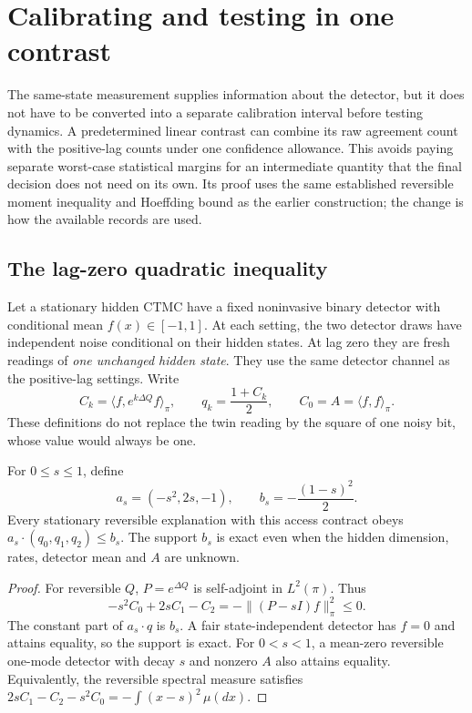 \chapter{Calibrating and testing in one contrast}
\label{ch:ci-joint-calibration}

The same-state measurement supplies information about the detector, but it
does not have to be converted into a separate calibration interval before
testing dynamics. A predetermined linear contrast can combine its raw
agreement count with the positive-lag counts under one confidence allowance.
This avoids paying separate worst-case statistical margins for an intermediate
quantity that the final decision does not need on its own. Its proof uses the
same established reversible moment inequality and Hoeffding bound as the
earlier construction; the change is how the available records are used.

\section{The lag-zero quadratic inequality}
Let a stationary hidden CTMC have a fixed noninvasive binary detector with
conditional mean $f(x)\in[-1,1]$. At each setting, the two detector draws have
independent noise conditional on their hidden states. At lag zero they are
fresh readings of \emph{one unchanged hidden state}. They use the same detector
channel as the positive-lag settings. Write
\[
 C_k=\langle f,e^{k\Delta Q}f\rangle_\pi,\qquad
 q_k=\frac{1+C_k}{2},\qquad C_0=A=\langle f,f\rangle_\pi.
\]
These definitions do not replace the twin reading by the square of one noisy
bit, whose value would always be one.

\begin{proposition}
For $0\leq s\leq1$, define
\begin{equation}
 a_s=(-s^2,2s,-1),\qquad b_s=-\frac{(1-s)^2}{2}.
 \label{eq:ci-joint-support}
\end{equation}
Every stationary reversible explanation with this access contract obeys
$a_s\cdot(q_0,q_1,q_2)\leq b_s$. The support $b_s$ is exact even when the
hidden dimension, rates, detector mean and $A$ are unknown.
\end{proposition}
\begin{proof}
For reversible $Q$, $P=e^{\Delta Q}$ is self-adjoint in $L^2(\pi)$. Thus
\[
 -s^2 C_0+2s C_1-C_2=-\|(P-sI)f\|_\pi^2\leq0.
\]
The constant part of $a_s\cdot q$ is $b_s$. A fair state-independent detector
has $f=0$ and attains equality, so the support is exact. For $0<s<1$, a
mean-zero reversible one-mode detector with decay $s$ and nonzero $A$ also
attains equality. Equivalently, the reversible spectral measure satisfies
$2sC_1-C_2-s^2C_0=-\int(x-s)^2\,\mu(dx)$.
\end{proof}

